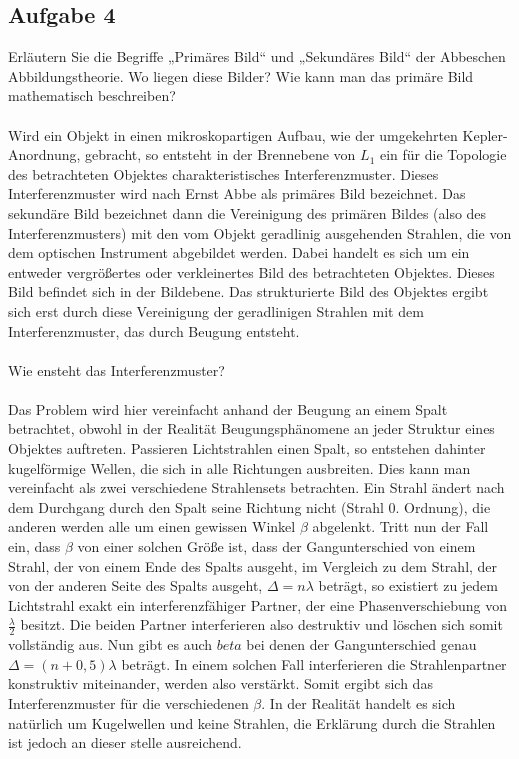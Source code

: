 \documentclass[a4paper,10pt]{scrartcl}
\begin{document}
		\subsection{Aufgabe 4}
			Erläutern Sie die Begriffe „Primäres Bild“ und „Sekundäres Bild“ der Abbeschen Abbildungstheorie.
			Wo liegen diese Bilder? Wie kann man das primäre Bild mathematisch beschreiben?\\
			\\
			Wird ein Objekt in einen mikroskopartigen Aufbau, wie der umgekehrten Kepler-Anordnung, gebracht, so entsteht in der Brennebene von \(L_{1}\) ein für die Topologie des betrachteten Objektes charakteristisches Interferenzmuster. Dieses Interferenzmuster wird nach Ernst Abbe als primäres Bild bezeichnet. Das sekundäre Bild bezeichnet dann die Vereinigung des primären Bildes (also des Interferenzmusters) mit den vom Objekt geradlinig ausgehenden Strahlen, die von dem optischen Instrument abgebildet werden. Dabei handelt es sich um ein entweder vergrößertes oder verkleinertes Bild des betrachteten Objektes. Dieses Bild befindet sich in der Bildebene. Das strukturierte Bild des Objektes ergibt sich erst durch diese Vereinigung der geradlinigen Strahlen mit dem Interferenzmuster, das durch Beugung entsteht.\\
			\\
			Wie ensteht das Interferenzmuster?\\
			\\
			Das Problem wird hier vereinfacht anhand der Beugung an einem Spalt betrachtet, obwohl in der Realität Beugungsphänomene an jeder Struktur eines Objektes auftreten. Passieren Lichtstrahlen einen Spalt, so entstehen dahinter kugelförmige Wellen, die sich in alle Richtungen ausbreiten. Dies kann man vereinfacht als zwei verschiedene Strahlensets betrachten. Ein Strahl ändert nach dem Durchgang durch den Spalt seine Richtung nicht (Strahl 0. Ordnung), die anderen werden alle um einen gewissen Winkel \(\beta\) abgelenkt. Tritt nun der Fall ein, dass \(\beta\) von einer solchen Größe ist, dass der Gangunterschied von einem Strahl, der von einem Ende des Spalts ausgeht, im Vergleich zu dem Strahl, der von der anderen Seite des Spalts ausgeht, \(\Delta=n\lambda\) beträgt, so existiert zu jedem Lichtstrahl exakt ein interferenzfähiger Partner, der eine Phasenverschiebung von \(\frac{\lambda}{2}\) besitzt. Die beiden Partner interferieren also destruktiv und löschen sich somit vollständig aus. Nun gibt es auch \(beta\) bei denen der Gangunterschied genau \(\Delta=(n+0,5)\lambda\) beträgt. In einem solchen Fall interferieren die Strahlenpartner konstruktiv miteinander, werden also verstärkt. Somit ergibt sich das Interferenzmuster für die verschiedenen \(\beta\). In der Realität handelt es sich natürlich um Kugelwellen und keine Strahlen, die Erklärung durch die Strahlen ist jedoch an dieser stelle ausreichend.\\
\end{document}
